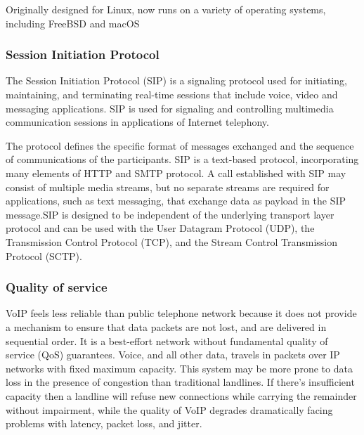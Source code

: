 \documentclass[a4paper,12pt]{book}
\begin{document}
Originally designed for Linux, now runs on a variety of operating systems, including FreeBSD and macOS

\subsubsection{Session Initiation Protocol}
The Session Initiation Protocol (SIP) is a signaling protocol used for initiating, maintaining, and terminating real-time sessions that include voice, video and messaging applications. SIP is used for signaling and controlling multimedia communication sessions in applications of Internet telephony.

The protocol defines the specific format of messages exchanged and the sequence of communications of the participants. SIP is a text-based protocol, incorporating many elements of HTTP and SMTP protocol. A call established with SIP may consist of multiple media streams, but no separate streams are required for applications, such as text messaging, that exchange data as payload in the SIP message.SIP is designed to be independent of the underlying transport layer protocol and can be used with the User Datagram Protocol (UDP), the Transmission Control Protocol (TCP), and the Stream Control Transmission Protocol (SCTP).
 

\subsubsection{Quality of service}
VoIP feels less reliable than  public telephone network because it does not provide a mechanism to ensure that data packets are not lost, and are delivered in sequential order. It is a best-effort network without fundamental quality of service (QoS) guarantees. Voice, and all other data, travels in packets over IP networks with fixed maximum capacity. This system may be more prone to data loss in the presence of congestion than traditional landlines. If there's insufficient capacity then a landline will refuse new connections while carrying the remainder without impairment, while the quality of VoIP degrades dramatically facing problems with latency, packet loss, and jitter.
\end{document}
